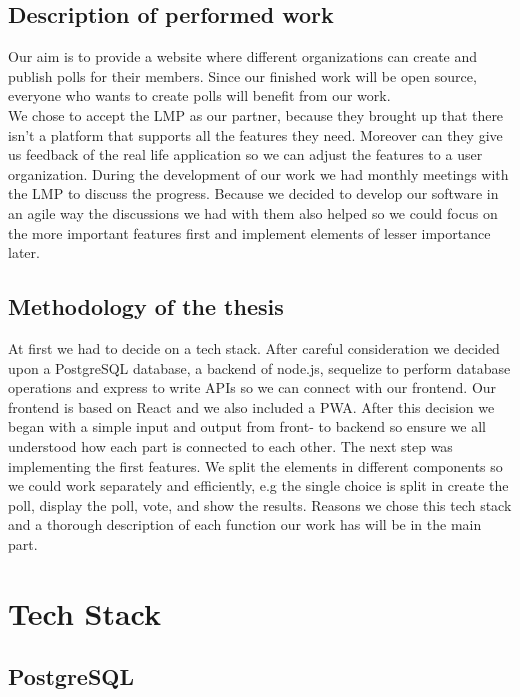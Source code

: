 \documentclass[a4paper,12pt]{report}
\begin{document}
\section{Description of performed work}
Our aim is to provide a website where different organizations can create and publish polls for their members. Since our finished work will be open source, everyone who wants to create polls will benefit from our work. \\
We chose to accept the LMP as our partner, because they brought up that there isn't a platform that supports all the features they need. Moreover can they give us feedback of the real life application so we can adjust the features to a user organization. During the development of our work we had monthly meetings with the LMP to discuss the progress. Because we decided to develop our software in an agile way the discussions we had with them also helped so we could focus on the more important features first and implement elements of lesser importance later.  

\section{Methodology of the thesis}
At first we had to decide on a tech stack. After careful consideration we decided upon a PostgreSQL database, a backend of node.js, sequelize to perform database operations and express to write APIs so we can connect with our frontend. Our frontend is based on React and we also included a PWA. After this decision we began with a simple input and output from front- to backend so ensure we all understood how each part is connected to each other. The next step was implementing the first features. We split the elements in different components so we could work separately and efficiently, e.g the single choice is split in create the poll, display the poll, vote, and show the results. Reasons we chose this tech stack and a thorough description of each function our work has will be in the main part.  

\chapter{Tech Stack}
\section{PostgreSQL}
\end{document}
